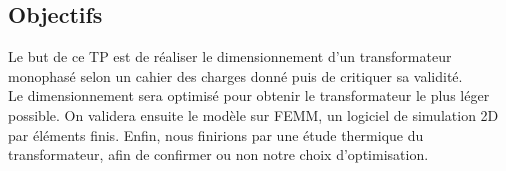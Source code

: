 \subsection{Objectifs}
Le but de ce TP est de réaliser le dimensionnement d'un transformateur monophasé selon un cahier des charges donné puis de critiquer sa validité.\\
Le dimensionnement sera optimisé pour obtenir le transformateur le plus léger possible. On validera ensuite le modèle sur FEMM, un logiciel de simulation 2D par éléments finis. Enfin, nous finirions par une étude thermique du transformateur, afin de confirmer ou non notre choix d'optimisation.\\